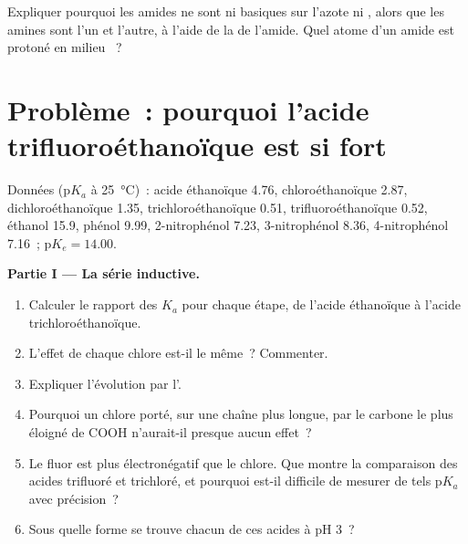 \begin{exercise}[$\star\star\star$]\label{exo:b1:electronic-effects:12}
Expliquer pourquoi les amides ne sont ni basiques sur l'azote ni
, alors que les amines sont l'un et l'autre, à l'aide de la
 de l'amide. Quel atome d'un amide est protoné en milieu
~?
\end{exercise}

\section{Problème~: pourquoi l'acide trifluoroéthanoïque est si fort}

\begin{problem}
\label{pb:b1:electronic-effects:1}
Données ($\mathrm{p}K_a$ à \qty{25}{\celsius})~: acide éthanoïque 4.76,
chloroéthanoïque 2.87, dichloroéthanoïque 1.35, trichloroéthanoïque 0.51,
trifluoroéthanoïque 0.52, éthanol 15.9, phénol 9.99, 2-nitrophénol 7.23,
3-nitrophénol 8.36, 4-nitrophénol 7.16~; $\mathrm{p}K_e = 14.00$.

\medskip
\noindent\textbf{Partie I --- La série inductive.}
\begin{enumerate}
  \item Calculer le rapport des $K_a$ pour chaque étape, de l'acide
        éthanoïque à l'acide trichloroéthanoïque.
  \item L'effet de chaque chlore est-il le même~? Commenter.
  \item Expliquer l'évolution par l'.
  \item Pourquoi un chlore porté, sur une chaîne plus longue, par le
        carbone le plus éloigné de COOH n'aurait-il presque aucun effet~?
  \item Le fluor est plus électronégatif que le chlore. Que montre la
        comparaison des acides trifluoré et trichloré, et pourquoi est-il
        difficile de mesurer de tels $\mathrm{p}K_a$ avec précision~?
  \item Sous quelle forme se trouve chacun de ces acides à pH 3~?
\end{enumerate}


\end{problem}
